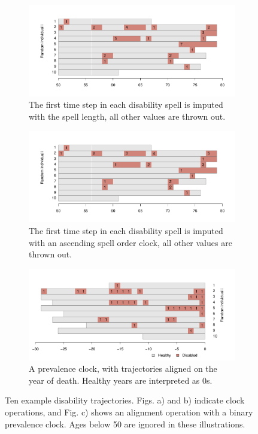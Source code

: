 \documentclass[a4paper,left=1.25cm,right=1.25cm,top=1.25cm,bottom=1.25cm]{article}
\begin{document}
\begin{figure}
    \centering
    \begin{subfigure}{\textwidth}
      \centering
    \includegraphics[scale=.45]{Figures/App1_grammar1.pdf}
    \caption{The first time step in each disability spell is imputed with the spell length, all other values are thrown out.}
    \label{fig:a1g1}
    \end{subfigure}
    
        \begin{subfigure}{\textwidth}
          \centering
    \includegraphics[scale=.45]{Figures/App1_grammar2.pdf}
    \caption{The first time step in each disability spell is imputed with an ascending spell order clock, all other values are thrown out.}
    \label{fig:a1g2}
    \end{subfigure}
    
        \begin{subfigure}{\textwidth}
          \centering
          \includegraphics[scale=.45]{Figures/App1_grammar3.pdf}
    \caption{A prevalence clock, with trajectories aligned on the year of death. Healthy years are interpreted as 0s.}
    \label{fig:a1g3}
    \end{subfigure}
    \caption{Ten example disability trajectories. Figs. a) and b) indicate clock operations, and Fig. c) shows an alignment operation with a binary prevalence clock. Ages below 50 are ignored in these illustrations.}
    \label{fig:a1traj}
\end{figure}
\end{document}
